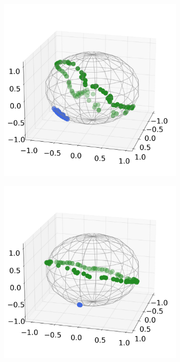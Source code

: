 \documentclass[10pt,twocolumn,letterpaper]{article}
\begin{document}
\begin{figure}[t]
\begin{subfigure}{0.49\linewidth}
       \caption{}
       \label{fig:sim1-b}
     \end{subfigure}
     \hfill
     \begin{subfigure}{0.49\linewidth}
       \includegraphics[width=\linewidth,trim={0 1.5cm 0 1.5cm},clip]{figures/experiments/sim_new/selfsup.jpeg}
       \caption{}
       \label{fig:sim1-c}
     \end{subfigure}
     \hfill
     \begin{subfigure}{0.49\linewidth}
       \includegraphics[width=\linewidth,trim={0 1.5cm 0 1.5cm},clip]{figures/experiments/sim_new/final.jpeg}

\end{subfigure}
\end{figure}
\end{document}
